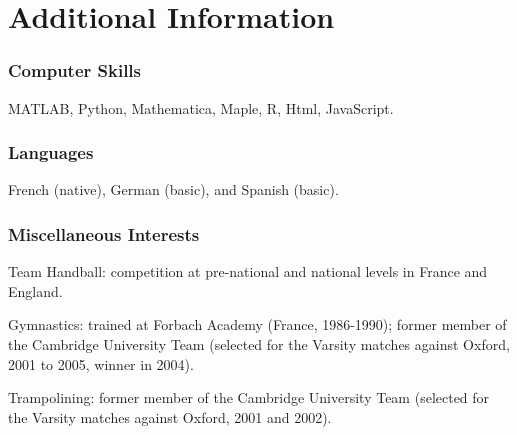 \documentclass[11pt]{article}
\begin{document}
\section{Additional Information}

\subsubsection{Computer Skills} 
MATLAB, Python, Mathematica, Maple, R, Html, JavaScript.

\subsubsection{Languages}
French (native), German (basic), and Spanish (basic).

\subsubsection{Miscellaneous Interests} 
\bitemize
\item Team Handball: competition at pre-national and national levels in France and England.
\item Gymnastics:  trained at Forbach Academy (France, 1986-1990); former member of the Cambridge University Team (selected for the Varsity matches against Oxford, 2001 to 2005, winner in 2004).
\item Trampolining: former member of the Cambridge University Team (selected for the Varsity matches against Oxford, 2001 and 2002).
\eitemize

\end{document}
